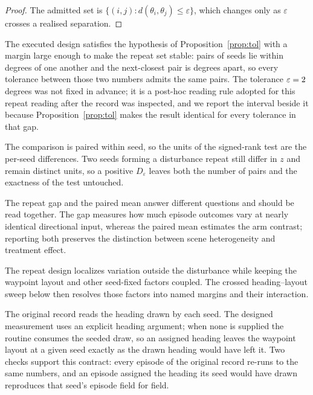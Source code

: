 \begin{proof}
The admitted set is $\{(i,j) : d(\theta_i,\theta_j) \le \varepsilon\}$, which
changes only as $\varepsilon$ crosses a realised separation.
\end{proof}

The executed design satisfies the hypothesis of Proposition~\ref{prop:tol} with
a margin large enough to make the repeat set stable: \NRepeats{} pairs of
seeds lie within \WidestRepeat{} degrees of one another and the next-closest
pair is \NearestDistinct{} degrees apart, so every tolerance between those two
numbers admits the same \NRepeats{} pairs. The tolerance $\varepsilon = 2{}$
degrees was not fixed in advance; it is a post-hoc reading rule adopted for this
repeat reading after the record was inspected, and we report the interval beside
it because Proposition~\ref{prop:tol} makes the result identical for every
tolerance in that gap.

\begin{corollary}\label{cor:notn}
The comparison is paired within seed, so the units of the signed-rank test are
the \NSeeds{} per-seed differences. Two seeds forming a disturbance repeat still
differ in $z$ and remain distinct units, so a positive $D_\varepsilon$ leaves
both the number of pairs and the exactness of the test untouched.
\end{corollary}

The repeat gap and the paired mean answer different questions and should be read
together. The gap measures how much episode outcomes vary at nearly identical
directional input, whereas the paired mean estimates the arm contrast; reporting
both preserves the distinction between scene heterogeneity and treatment effect.

The repeat design localizes variation outside the disturbance while keeping the
waypoint layout and other seed-fixed factors coupled. The crossed heading--layout
sweep below then resolves those factors into named margins and their interaction.

The original record reads the heading drawn by each seed. The designed measurement
uses an explicit heading argument; when none is supplied the routine consumes the
seeded draw, so an assigned heading leaves the waypoint layout at a given seed
exactly as the drawn heading would have left it. Two checks support this contract:
every episode of the original record re-runs to the same numbers, and an episode
assigned the heading its seed would have drawn reproduces that seed's episode
field for field.


